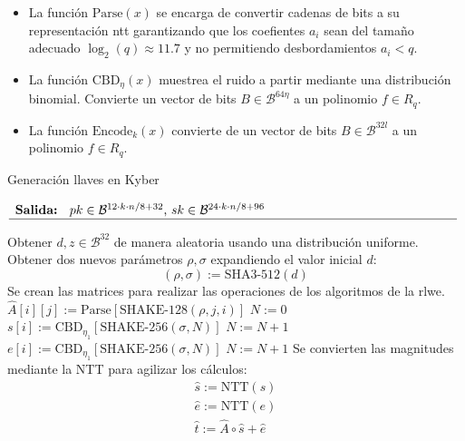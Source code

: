 \begin{itemize}
	\item La función $\text{Parse}(x)$ se encarga de convertir cadenas de bits a su representación \gls{ntt} garantizando que los coefientes \(a_i\) sean del tamaño adecuado \(\log_2(q)\approx 11.7\) y no permitiendo desbordamientos \(a_i<q\).
	\item La función $\text{CBD}_\eta(x)$ muestrea el ruido a partir mediante una distribución binomial. Convierte un vector de bits \(B\in\mathcal{B}^{64\eta}\) a un polinomio \(f\in R_q\).
	\item La función $\text{Encode}_k(x)$ convierte de un vector de bits \(B\in\mathcal{B}^{32l}\) a un polinomio \(f\in R_q\).
\end{itemize}
  

\begin{algorithm}[H]
	\caption{Generación llaves en Kyber}
	$\begin{array}{p{\textwidth}}
		\textbf{Salida: } \(pk\in \mathcal{B}^{12\cdot k\cdot n/8+32}\), \(sk\in \mathcal{B}^{24\cdot k\cdot n/8+96}\) \\ 
		\hline
	\end{array}$
	\begin{algorithmic}[1]
		\State Obtener \(d, z\in\mathcal{B}^{32}\) de manera aleatoria usando una distribución uniforme.
		\State Obtener dos nuevos parámetros \(\rho, \sigma\) expandiendo el valor inicial \(d\):
		\begin{equation}
			(\rho, \sigma):=\text{SHA3-512}(d)
		\end{equation}
		\Statex Se crean las matrices para realizar las operaciones de los algoritmos de la  \gls{rlwe}.
				\State $\hat{A}[i][j]:=\text{Parse}[\text{SHAKE-128}(\rho,j,i)]$ 
			\EndFor
		\EndFor
		\State $N:=0$
			\State $s[i]:= \text{CBD}_{\eta_1}[\text{SHAKE-256}(\sigma,N)]$ 
			\State $N:= N+1$
		\EndFor
			\State $e[i]:= \text{CBD}_{\eta_1}[\text{SHAKE-256}(\sigma,N)]$ 
			\State $N:= N+1$
		\EndFor
		\State Se convierten las magnitudes mediante la NTT para agilizar los cálculos:
		\begin{equation}
				\begin{array}{l}
					\hat{s}:=\text{NTT}(s)\\
					\hat{e}:=\text{NTT}(e)\\
					\hat{t}:=\hat{A}\circ\hat{s}+\hat{e}\\

\end{array}
\end{equation}
\end{algorithmic}
\end{algorithm}

